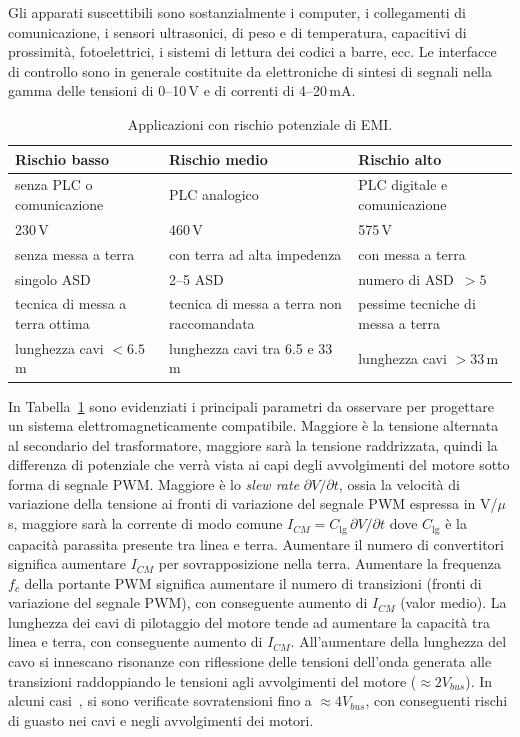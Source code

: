Gli apparati suscettibili sono sostanzialmente i computer, i collegamenti di comunicazione, i sensori ultrasonici, di peso e di temperatura, capacitivi di prossimità, fotoelettrici, i sistemi di lettura dei codici a barre, ecc. Le interfacce di controllo sono in generale costituite da elettroniche di sintesi di segnali nella gamma delle tensioni di 0--10\,V e di correnti di 4--20\,mA.

\begin{table}[htbp]
\centering
\caption{Applicazioni con rischio potenziale di EMI.}
\label{tab:emi_risk}
\begin{tabular}{p{}p{}p{}}
\hline
\textbf{Rischio basso} & \textbf{Rischio medio} & \textbf{Rischio alto} \\
\hline
senza PLC o comunicazione & PLC analogico & PLC digitale e comunicazione \\
230\,V & 460\,V & 575\,V \\
senza messa a terra & con terra ad alta impedenza & con messa a terra \\
singolo ASD & 2--5 ASD & numero di ASD~$>5$ \\
tecnica di messa a terra ottima & tecnica di messa a terra non raccomandata & pessime tecniche di messa a terra \\
lunghezza cavi $<6.5$\,m & lunghezza cavi tra 6.5 e 33\,m & lunghezza cavi $>33$\,m \\
\hline
\end{tabular}
\end{table}

In Tabella~\ref{tab:emi_risk} sono evidenziati i principali parametri da osservare per progettare un sistema elettromagneticamente compatibile. Maggiore è la tensione alternata al secondario del trasformatore, maggiore sarà la tensione raddrizzata, quindi la differenza di potenziale che verrà vista ai capi degli avvolgimenti del motore sotto forma di segnale PWM. Maggiore è lo \textit{slew rate} $\partial V/\partial t$, ossia la velocità di variazione della tensione ai fronti di variazione del segnale PWM espressa in V/$\mu$s, maggiore sarà la corrente di modo comune $I_{CM} = C_{\lg} \,\partial V/\partial t$ dove $C_{\lg}$ è la capacità parassita presente tra linea e terra. Aumentare il numero di convertitori significa aumentare $I_{CM}$ per sovrapposizione nella terra. Aumentare la frequenza $f_c$ della portante PWM significa aumentare il numero di transizioni (fronti di variazione del segnale PWM), con conseguente aumento di $I_{CM}$ (valor medio). La lunghezza dei cavi di pilotaggio del motore tende ad aumentare la capacità tra linea e terra, con conseguente aumento di $I_{CM}$. All'aumentare della lunghezza del cavo si innescano risonanze con riflessione delle tensioni dell'onda generata alle transizioni raddoppiando le tensioni agli avvolgimenti del motore ($\approx 2 V_{bus}$). In alcuni casi~\cite{amarir2008}, si sono verificate sovratensioni fino a $\approx 4 V_{bus}$, con conseguenti rischi di guasto nei cavi e negli avvolgimenti dei motori.

